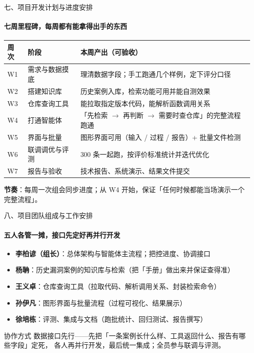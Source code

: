 \documentclass{beamer}
\begin{document}
\begin{frame}{七、项目开发计划与进度安排}
\framesubtitle{七周里程碑，每周都有能拿得出手的东西}
\centering
\footnotesize
\begin{tabular}{@{}p{}p{}p{}@{}}
\toprule
\textbf{周次} & \textbf{阶段} & \textbf{本周产出（可验收）} \\
\midrule
W1 & 需求与数据摸底 & 理清数据字段；手工跑通几个样例，定下评分口径 \\
W2 & 搭建知识库     & 历史案例入库，检索功能可用并能自测效果 \\
W3 & 仓库查询工具   & 能拉取指定版本代码，能解析函数调用关系 \\
W4 & 打通智能体     & 「先检索 $\rightarrow$ 再判断 $\rightarrow$ 需要时查仓库」的完整流程跑通 \\
W5 & 界面与批量     & 图形界面可用（输入 / 过程 / 报告）+ 批量文件检测 \\
W6 & 联调调优与评测 & 300 条一起跑，按评价标准统计并迭代优化 \\
W7 & 报告与验收     & 技术报告、系统演示、结果文件提交 \\
\bottomrule
\end{tabular}
\vspace{0.5em}

{\footnotesize \textbf{节奏}：每周一次组会同步进度；从 W4 开始，保证「任何时候都能当场演示一个完整流程」。}
\end{frame}

\begin{frame}{八、项目团队组成与工作安排}
\framesubtitle{五人各管一摊，接口先定好再并行开发}
\small
\begin{itemize}
\item \textbf{李柏谚（组长）}：总体架构与智能体主流程；把控进度、协调接口
\item \textbf{杨聃}：历史漏洞案例的知识库与检索（把「手册」做出来并保证查得准）
\item \textbf{王义卓}：仓库查询工具（拉取代码、解析调用关系、封装检索命令）
\item \textbf{孙伊凡}：图形界面与批量流程（过程可视化、结果展示）
\item \textbf{徐培栋}：评测、集成与文档（跑批统计、回归测试、报告撰写）
\end{itemize}
\vspace{0.2em}
\begin{block}{协作方式}
数据接口先行——先把「一条案例长什么样、工具返回什么、报告有哪些字段」定死，
各人再并行开发，最后统一集成；全员参与联调与评测。
\end{block}
\end{frame}
\end{document}
